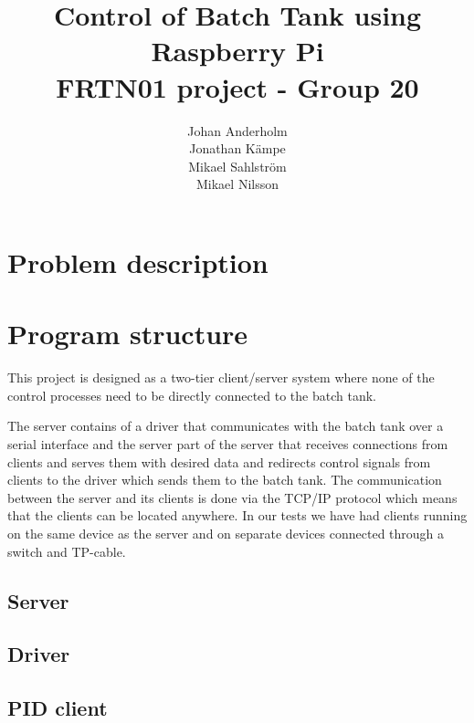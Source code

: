 \documentclass{article}
\title{Control of Batch Tank using Raspberry Pi \\ FRTN01 project - Group 20}
\date{}
\author{Johan Anderholm \\ Jonathan Kämpe \\ Mikael Sahlström \\ Mikael Nilsson}
\begin{document}
\maketitle
\newpage
\tableofcontents
\newpage
\section{Problem description}

\section{Program structure}
This project is designed as a two-tier client/server system \cite[p.~6]{clientserver} where none of the control processes need to be directly connected to the batch tank.

The server contains of a driver that communicates with the batch tank over a serial interface and the server part of the server that receives connections from clients and serves them with desired data and redirects control signals from clients to the driver which sends them to the batch tank. The communication between the server and its clients is done via the TCP/IP protocol which means that the clients can be located anywhere. In our tests we have had clients running on the same device as the server and on separate devices connected through a switch and TP-cable.

\subsection{Server}

\subsection{Driver}

\subsection{PID client}
\end{document}
